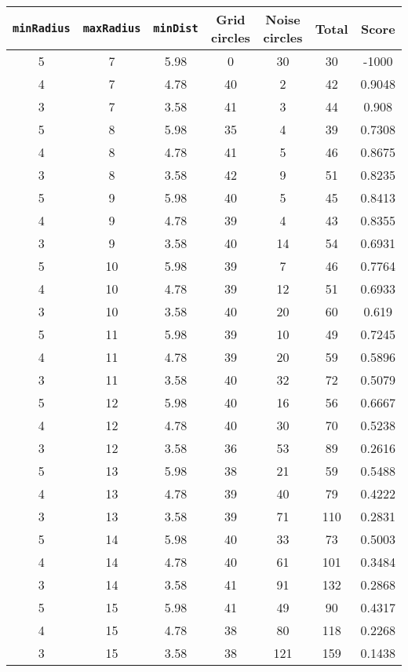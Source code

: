 \documentclass[letterpaper, 12pt]{article}
\begin{document}
\begin{longtable}{|c|c|c|c|c|c|c|}
\hline
\textbf{\texttt{minRadius}} & \textbf{\texttt{maxRadius}} & \textbf{\texttt{minDist}} & \textbf{Grid circles} & \textbf{Noise circles} & \textbf{Total} & \textbf{Score} \\
\hline
5 & 7 & 5.98 & 0 & 30 & 30 & -1000 \\
\hline
4 & 7 & 4.78 & 40 & 2 & 42 & 0.9048 \\
\hline
3 & 7 & 3.58 & 41 & 3 & 44 & 0.908 \\
\hline
5 & 8 & 5.98 & 35 & 4 & 39 & 0.7308 \\
\hline
4 & 8 & 4.78 & 41 & 5 & 46 & 0.8675 \\
\hline
3 & 8 & 3.58 & 42 & 9 & 51 & 0.8235 \\
\hline
5 & 9 & 5.98 & 40 & 5 & 45 & 0.8413 \\
\hline
4 & 9 & 4.78 & 39 & 4 & 43 & 0.8355 \\
\hline
3 & 9 & 3.58 & 40 & 14 & 54 & 0.6931 \\
\hline
5 & 10 & 5.98 & 39 & 7 & 46 & 0.7764 \\
\hline
4 & 10 & 4.78 & 39 & 12 & 51 & 0.6933 \\
\hline
3 & 10 & 3.58 & 40 & 20 & 60 & 0.619 \\
\hline
5 & 11 & 5.98 & 39 & 10 & 49 & 0.7245 \\
\hline
4 & 11 & 4.78 & 39 & 20 & 59 & 0.5896 \\
\hline
3 & 11 & 3.58 & 40 & 32 & 72 & 0.5079 \\
\hline
5 & 12 & 5.98 & 40 & 16 & 56 & 0.6667 \\
\hline
4 & 12 & 4.78 & 40 & 30 & 70 & 0.5238 \\
\hline
3 & 12 & 3.58 & 36 & 53 & 89 & 0.2616 \\
\hline
5 & 13 & 5.98 & 38 & 21 & 59 & 0.5488 \\
\hline
4 & 13 & 4.78 & 39 & 40 & 79 & 0.4222 \\
\hline
3 & 13 & 3.58 & 39 & 71 & 110 & 0.2831 \\
\hline
5 & 14 & 5.98 & 40 & 33 & 73 & 0.5003 \\
\hline
4 & 14 & 4.78 & 40 & 61 & 101 & 0.3484 \\
\hline
3 & 14 & 3.58 & 41 & 91 & 132 & 0.2868 \\
\hline
5 & 15 & 5.98 & 41 & 49 & 90 & 0.4317 \\
\hline
4 & 15 & 4.78 & 38 & 80 & 118 & 0.2268 \\
\hline
3 & 15 & 3.58 & 38 & 121 & 159 & 0.1438 \\

\end{longtable}
\end{document}
